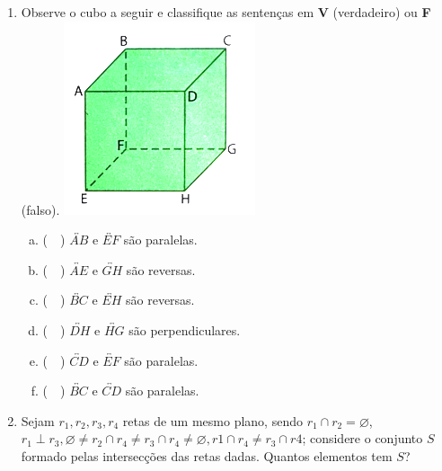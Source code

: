 \documentclass[a4paper,14pt]{article}
\begin{document}
\begin{multicols}{2}
\begin{enumerate}
   			\item Observe o cubo a seguir e classifique as sentenças em \textbf{V} (verdadeiro) ou \textbf{F} (falso).
   			\includegraphics[width=1\linewidth]{6FMA69_imagens/imagem5} \\
   			\begin{enumerate}[a)]
   				\item (~~) $\overleftrightarrow{AB}$ e $\overleftrightarrow{EF}$ são paralelas.
   				\item (~~) $\overleftrightarrow{AE}$ e $\overleftrightarrow{GH}$ são reversas.
   				\item (~~) $\overleftrightarrow{BC}$ e $\overleftrightarrow{EH}$ são reversas.
   				\item (~~) $\overleftrightarrow{DH}$ e $\overleftrightarrow{HG}$ são perpendiculares.
   				\item (~~) $\overleftrightarrow{CD}$ e $\overleftrightarrow{EF}$ são paralelas.
   				\item (~~) $\overleftrightarrow{BC}$ e $\overleftrightarrow{CD}$ são paralelas.   				
   			\end{enumerate}
   			\item Sejam $r_1, r_2, r_3, r_4$ retas de um mesmo plano, sendo $r_1 \cap r_2 = \varnothing$, $r_1 \perp r_3, \varnothing \neq r_2 \cap r_4 \neq r_3 \cap r_4 \neq \varnothing, r1 \cap r_4 \neq r_3 \cap r4$; considere o conjunto $S$ formado pelas intersecções das retas dadas. Quantos elementos tem $S$? \newpage

\end{enumerate}
\end{multicols}
\end{document}
